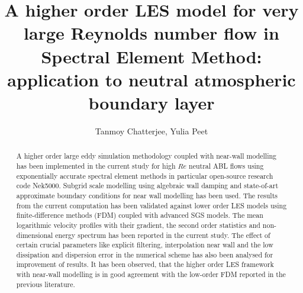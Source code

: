 \documentclass[times]{fldauth}
\begin{document}

\title{A higher order LES model for very large Reynolds number flow in Spectral Element Method: application to neutral atmospheric boundary layer}


\author{Tanmoy Chatterjee\corrauth, Yulia Peet}

\address{School for Engineering of Matter, Transport and Energy (SEMTE), 501 E. Tyler Mall, Arizona State University, Tempe, AZ - 85287}


\begin{abstract}
A higher order large eddy simulation methodology coupled with near-wall modelling has been implemented in the current study for high $Re$ neutral ABL flows using exponentially accurate spectral element methods in particular open-source research code Nek5000. Subgrid scale modelling using algebraic wall damping and state-of-art approximate boundary conditions for near wall modelling has been used. The results from the current computation has been validated against lower order LES models using finite-difference methods (FDM) coupled with advanced SGS models. The mean logarithmic velocity profiles with their gradient, the second order statistics and non-dimensional energy spectrum has been reported in the current study. The effect of certain crucial parameters like explicit filtering, interpolation near wall and the low dissipation and dispersion error in the numerical scheme has also been analysed for improvement of results. It has been observed, that the higher order LES framework with near-wall modelling is in good agreement with the low-order FDM reported in the previous literature.\\

\end{abstract}

\maketitle

\end{document}
